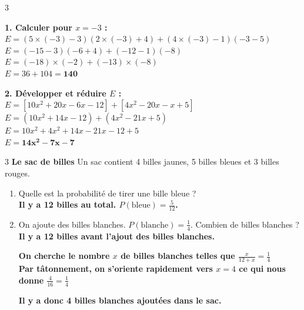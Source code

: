\documentclass[a4paper]{book}
\begin{document}
{\begin{exerciceNote}{3}
        \medskip
        \begin{minipage}{0.5\linewidth}
            \textbf{1. Calculer pour $x = -3$ :} \\
            $E = (5 \times (-3)-3)(2 \times (-3)+4) + (4 \times (-3)-1)(-3-5)$ \\
            $E = (-15-3)(-6+4) + (-12-1)(-8)$ \\
            $E = (-18) \times (-2) + (-13) \times (-8)$ \\
            $E = 36 + 104 = \mathbf{140}$
        \end{minipage}
        \hfill
        \begin{minipage}{0.49\linewidth}
            \textbf{2. Développer et réduire $E$ :} \\
            $E = [10x^2 + 20x - 6x - 12] + [4x^2 - 20x - x + 5]$ \\
            $E = (10x^2 + 14x - 12) + (4x^2 - 21x + 5)$ \\
            $E = 10x^2 + 4x^2 + 14x - 21x - 12 + 5$ \\
            $E = \mathbf{14x^2 - 7x - 7}$
        \end{minipage}
    \end{exerciceNote}

    \begin{exerciceNote}{3}
        \textbf{Le sac de billes}
        Un sac contient 4 billes jaunes, 5 billes bleues et 3 billes rouges.
        \begin{enumerate}
            \item Quelle est la probabilité de tirer une bille bleue ? \\
            \textbf{Il y a 12 billes au total. $P(\text{bleue}) = \frac{5}{12}$.}
            \item On ajoute des billes blanches. $P(\text{blanche}) = \frac{1}{4}$. Combien de billes blanches ? \\
            \textbf{Il y a 12 billes avant l'ajout des billes blanches.}
            
            \textbf{On cherche le nombre $x$ de billes blanches telles que $\frac{x}{12+x}=\frac{1}{4}$}\\
            \textbf{Par tâtonnement, on s'oriente rapidement vers $x=4$ ce qui nous donne $\frac{4}{16}=\frac{1}{4}$}

            \textbf{Il y a donc 4 billes blanches ajoutées dans le sac.}
            
        \end{enumerate}
    \end{exerciceNote}

}
\end{document}
